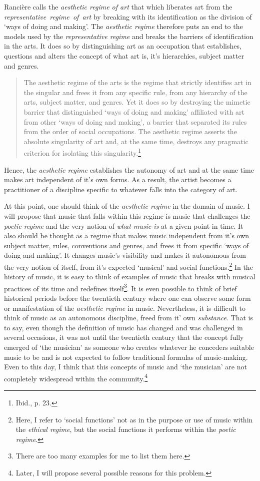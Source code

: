 Ranci\`{e}re calls the \emph{aesthetic regime of art} that which liberates art from the \mbox{\emph{representative regime of art}} by breaking with its identification as the division of `ways of doing and making'. The \emph{aesthetic regime} therefore puts an end to the models used by the \emph{representative regime} and breaks the barriers of identification in the arts. It does so by distinguishing art as an occupation that establishes, questions and alters the concept of what art is, it's hierarchies, subject matter and genres. 
\begin{quote}
The aesthetic regime of the arts is the regime that strictly identifies art in the singular and frees it from any specific rule, from any hierarchy of the arts, subject matter, and genres. Yet it does so by destroying the mimetic barrier that distinguished `ways of doing and making' affiliated with art from other `ways of doing and making', a barrier that separated its rules from the order of social occupations. The aesthetic regime asserts the absolute singularity of art and, at the same time, destroys any pragmatic criterion for isolating this singularity.\footnote{Ibid., p. 23.}
\end{quote}
Hence, the \emph{aesthetic regime} establishes the autonomy of art and at the same time makes art independent of it's own forms. As a result, the artist becomes a practitioner of a discipline specific to whatever falls into the category of art. 

At this point, one should think of the \emph{aesthetic regime} in the domain of music. I will propose that music that falls within this regime is music that challenges the \emph{poetic regime} and the very notion of \emph{what music is} at a given point in time. It also should be thought as a regime that makes music independent from it's own subject matter, rules, conventions and genres, and frees it from specific `ways of doing and making'. It changes music's visibility and makes it autonomous from the very notion of itself, from it's expected `musical' and social functions.\footnote{Here, I refer to `social functions' not as in the purpose or use of music within the \emph{ethical regime}, but the social functions it performs within the \emph{poetic regime}.} In the history of music, it is easy to think of examples of music that breaks with musical practices of its time and redefines itself\footnote{There are too many examples for me to list them here.}. It is even possible to think of brief historical periods before the twentieth century where one can observe some form or manifestation of the \emph{aesthetic regime} in music. Nevertheless, it is difficult to think of music as an autonomous discipline, freed from it' own \emph{substance}. That is to say, even though the definition of music has changed and was challenged in several occasions, it was not until the twentieth century that the concept fully emerged of `the musician' as someone who creates whatever he conceders suitable music to be and is not expected to follow traditional formulas of music-making. Even to this day, I think that this concepts of music and `the musician' are not completely widespread within the community.\footnote{Later, I will propose several possible reasons for this problem.}

